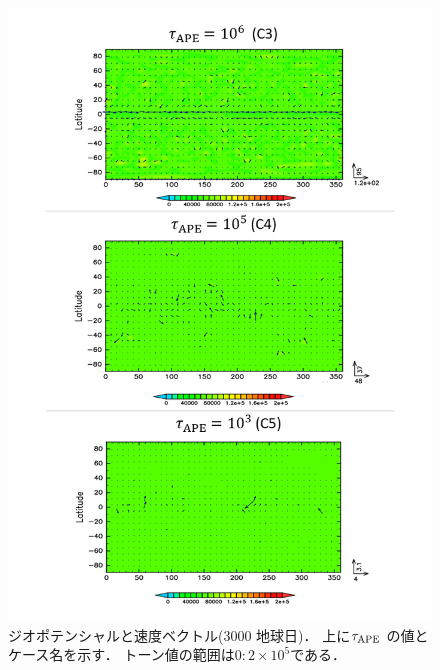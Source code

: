 \documentclass[a4j,12pt,openbib,oneside]{jreport}
\begin{document}
\begin{figure}[ht]
  \begin{center}
    \includegraphics[clip,width=14cm]{./fig/result/case2/case2_phi2.png}
    \caption{
      \footnotesize{ジオポテンシャルと速度ベクトル(3000 地球日)．
上に$\tau_{\rm{APE}}$ の値とケース名を示す．
トーン値の範囲は$0:2 \times 10^5$である．
      }
    }
    \label{fig:case2_phi2}
  \end{center}
\end{figure}
%
%
\end{document}
